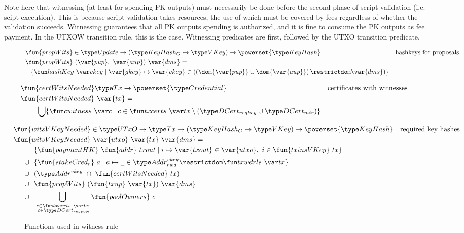 Note here that witnessing (at least for spending PK outputs) must necessarily
be done before the second phase of script validation (i.e. scipt execution).
This is because script validation takes resources, the use of which must
be covered by fees regardless of whether the validation succeeds. Witnessing
guarantees that all PK outputs spending is authorized, and it is fine to
consume the PK outputs as fee payment. In the UTXOW transition rule,
this is the case. Witnessing predicates are first, followed by the UTXO transition
predicate.

\begin{figure}[htb]
  \begin{align*}
    & \fun{propWits} \in \Update \to (\KeyHashGen\mapsto\VKey) \to \powerset{\KeyHash}
    & \text{hashkeys for proposals} \\
    & \fun{propWits}~(\var{pup},~\var{aup})~\var{dms} = \\
    & ~~\left\{
      \hashKey{vkey}
      \mid
      \var{gkey}\mapsto\var{vkey}\in
      \left(\left(\dom{\var{pup}}\cup\dom{\var{aup}}\right)\restrictdom\var{dms}\right)
      \right\}
  \end{align*}

  \begin{align*}
    & \hspace{-0.8cm}\fun{certWitsNeeded} \Tx \to \powerset{\Credential}
    & \text{certificates with witnesses} \\
    &  \hspace{-0.8cm}\fun{certWitsNeeded}~\var{tx} = \\
    & \bigcup\{\cwitness{c} \mid c \in \txcerts{tx} \setminus (\DCertRegKey\cup\DCertMir)\}
  \end{align*}

    \begin{align*}
    & \hspace{-0.8cm}\fun{witsVKeyNeeded} \in \UTxO \to \Tx \to (\KeyHashGen\mapsto\VKey) \to
      \powerset{\KeyHash}
    & \text{required key hashes} \\
    &  \hspace{-0.8cm}\fun{witsVKeyNeeded}~\var{utxo}~\var{tx}~\var{dms} = \\
    & ~~\{ \fun{paymentHK}~\fun{addr}~{txout} \mid i \mapsto \var{txout} \in \var{utxo},~i\in\fun{txinsVKey}~{tx} \} \\
    \cup & ~~
           \{\fun{stakeCred_r}~a\mid a\mapsto \wcard \in \AddrRWDVKey
      \restrictdom \txwdrls{tx}\}\\
    \cup & ~~(\AddrVKey ~\cap~\fun{certWitsNeeded}~{tx}) \\
    \cup & ~~\fun{propWits}~(\fun{txup}~\var{tx})~\var{dms} \\
    \cup & ~~\bigcup_{\substack{c \in \txcerts{tx} \\ ~c \in\DCertRegPool}} \fun{poolOwners}~{c}
  \end{align*}
  \caption{Functions used in witness rule}
  \label{fig:functions-witnesses}
\end{figure}



